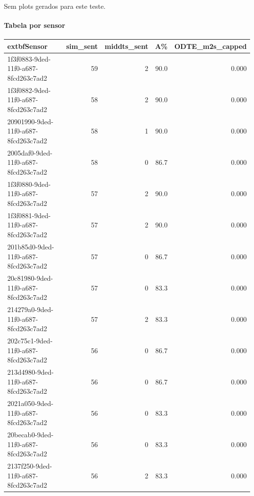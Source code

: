 Sem plots gerados para este teste.


\paragraph{Tabela por sensor}

\begin{longtable}{l r r r r}
	extbf{Sensor} & \textbf{sim_sent} & \textbf{middts_sent} & \textbf{A\%} & \textbf{ODTE\_m2s\_capped} \\
\hline

1f3f0883-9ded-11f0-a687-8fcd263c7ad2 & 59 & 2 & 90.0 & 0.000 \\

1f3f0882-9ded-11f0-a687-8fcd263c7ad2 & 58 & 2 & 90.0 & 0.000 \\

20901990-9ded-11f0-a687-8fcd263c7ad2 & 58 & 1 & 90.0 & 0.000 \\

2005daf0-9ded-11f0-a687-8fcd263c7ad2 & 58 & 0 & 86.7 & 0.000 \\

1f3f0880-9ded-11f0-a687-8fcd263c7ad2 & 57 & 2 & 90.0 & 0.000 \\

1f3f0881-9ded-11f0-a687-8fcd263c7ad2 & 57 & 2 & 90.0 & 0.000 \\

201b85d0-9ded-11f0-a687-8fcd263c7ad2 & 57 & 0 & 86.7 & 0.000 \\

20c81980-9ded-11f0-a687-8fcd263c7ad2 & 57 & 0 & 83.3 & 0.000 \\

214279a0-9ded-11f0-a687-8fcd263c7ad2 & 57 & 2 & 83.3 & 0.000 \\

202c75c1-9ded-11f0-a687-8fcd263c7ad2 & 56 & 0 & 86.7 & 0.000 \\

213d4980-9ded-11f0-a687-8fcd263c7ad2 & 56 & 0 & 86.7 & 0.000 \\

2021a050-9ded-11f0-a687-8fcd263c7ad2 & 56 & 0 & 83.3 & 0.000 \\

20becab0-9ded-11f0-a687-8fcd263c7ad2 & 56 & 0 & 83.3 & 0.000 \\

2137f250-9ded-11f0-a687-8fcd263c7ad2 & 56 & 2 & 83.3 & 0.000 \\


\end{longtable}
